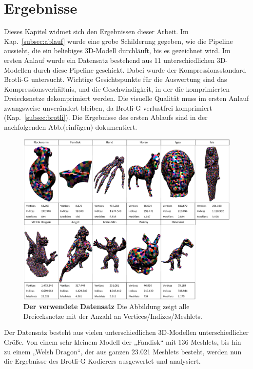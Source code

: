 \section{Ergebnisse}
\label{sec:ergebnisse}
Dieses Kapitel widmet sich den Ergebnissen dieser Arbeit. 
Im Kap.~\ref{subsec:ablauf} wurde eine grobe Schilderung gegeben, wie die Pipeline aussieht, die ein beliebiges 3D-Modell durchläuft, bis es gezeichnet wird.
Im ersten Anlauf wurde ein Datensatz bestehend aus 11 unterschiedlichen 3D-Modellen durch diese Pipeline geschickt. 
Dabei wurde der Kompressionsstandard Brotli-G untersucht. 
Wichtige Gesichtspunkte für die Auswertung sind das Kompressionsverhältnis, und die Geschwindigkeit, in der die komprimierten Dreiecksnetze dekomprimiert werden. 
Die visuelle Qualität muss im ersten Anlauf zwangsweise unverändert bleiben, da Brotli-G verlustfrei komprimiert (Kap.~\ref{subsec:brotli}). 
Die Ergebnisse des ersten Ablaufs sind in der nachfolgenden Abb.(einfügen) dokumentiert.

\begin{figure}[htb]
  \centering  
  \includegraphics[scale=0.5]{Bilder/Ergebnisse_zusammen.png}
  \caption[Der verwendete Datensatz]{\textbf{Der verwendete Datensatz} Die Abbildung zeigt alle Dreiecksnetze mit der Anzahl an Vertices/Indizes/Meshlets. }
  \label{fig:mesh_shading_pipeline}
\end{figure}

Der Datensatz besteht aus vielen unterschiedlichen 3D-Modellen unterschiedlicher Größe. 
Von einem sehr kleinem Modell der „Fandisk“ mit 136 Meshlets, bis hin zu einem „Welsh Dragon“, der aus ganzen 23.021 Meshlets besteht, werden nun die Ergebnisse des Brotli-G Kodierers ausgewertet und analysiert.


